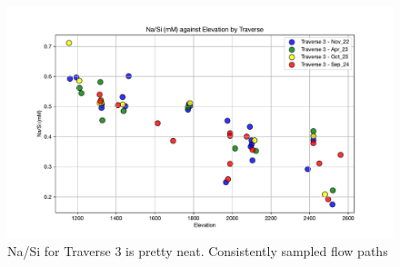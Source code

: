 \FloatBarrier

\begin{figure}[h]
    \centering
    \includegraphics[width=\textwidth]{Na_Si_Elevation.pdf}
    \caption{Na/Si for Traverse 3 is pretty neat. Consistently sampled flow paths}
    \label{fig:spatial_changes_spring10}
\end{figure}

\FloatBarrier


